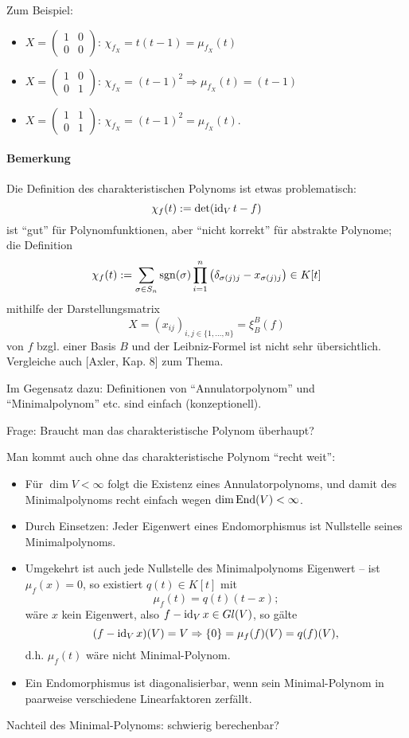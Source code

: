 	Zum Beispiel: 
		\begin{itemize}
			\item $ X = \begin{pmatrix}
			1&0\\0&0
			\end{pmatrix} $: $ \chi_{f_X} = t(t-1) = \mu_{f_X}(t)$
			\item $ X = \begin{pmatrix}
			1&0\\0&1
			\end{pmatrix} $: $ \chi_{f_X} = (t-1)^2 \Rightarrow \mu_{f_X}(t) = (t-1) $
			\item $ X = \begin{pmatrix}
			1&1\\0&1
			\end{pmatrix} $: $ \chi_{f_X} = (t-1)^2 = \mu_{f_X}(t)$.
		\end{itemize}

\paragraph{Bemerkung}
	Die Definition des charakteristischen Polynoms ist etwas problematisch:
		\[ \chi_f(t) := \det (\operatorname{id}_Vt-f) \]
	ist "`gut"' für Polynomfunktionen, aber "`nicht korrekt"' für abstrakte Polynome; die Definition 
		\[ \chi_f(t) := \sum_{\sigma\in S_n}\operatorname{sgn}(\sigma)\prod_{i=1}^{n}\left(\delta_{\sigma(j)j}-x_{\sigma(j)j} \right)\in K[t] \]
	mithilfe der Darstellungsmatrix
		\[ X = (x_{ij})_{i,j\in \{1,\dots,n\}} = \xi_B^B(f) \]
	von $ f $ bzgl. einer Basis $ B $ und der Leibniz-Formel ist nicht sehr übersichtlich. Vergleiche auch [Axler, Kap. 8] zum Thema.
	
	Im Gegensatz dazu: Definitionen von "`Annulatorpolynom"' und "`Minimalpolynom"' etc. sind einfach (konzeptionell).
	
	Frage: Braucht man das charakteristische Polynom überhaupt?
	
	Man kommt auch ohne das charakteristische Polynom "`recht weit"':
		\begin{itemize}
			\item Für $ \dim V <\infty $ folgt die Existenz eines Annulatorpolynoms, und damit des Minimalpolynoms recht einfach wegen $ \dim \operatorname{End}(V) <\infty $.
			\item Durch Einsetzen: Jeder Eigenwert eines Endomorphismus ist Nullstelle seines Minimalpolynoms.
			\item Umgekehrt ist auch jede Nullstelle des Minimalpolynoms Eigenwert -- ist $ \mu_f(x) = 0 $, so existiert $ q(t)\in K[t] $ mit
				\[ \mu_f(t) = q(t)(t-x); \]
			wäre $ x $ kein Eigenwert, also $ f-\operatorname{id}_V x \in Gl(V) $, so gälte
				\[ (f-\operatorname{id}_Vx)(V) = V \Rightarrow \{0\} = \mu_f(f)(V) = q(f)(V), \]
			d.h. $ \mu_f(t) $ wäre nicht Minimal-Polynom.
			\item Ein Endomorphismus ist diagonalisierbar, wenn sein Minimal-Polynom in paarweise verschiedene Linearfaktoren zerfällt.
		\end{itemize}
	
	Nachteil des Minimal-Polynoms: schwierig berechenbar?